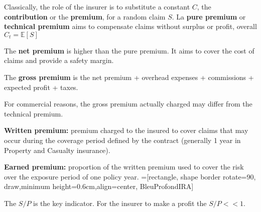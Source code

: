\begin{f}
Classically, the role of the insurer is to substitute a constant $C$, the \textbf{contribution} or the \textbf{premium}, for a random claim $S$.
La \textbf{pure premium} or \textbf{technical premium} aims 
to compensate claims without surplus or profit, overall $C_t = \mathbb{E}[S]$
	
	The \textbf{net premium} is higher than the pure premium. It aims to cover the cost of claims and provide a safety margin.
	
	The \textbf{gross premium} is the net premium + overhead expenses + commissions + expected profit + taxes.
	
	For commercial reasons, the gross premium actually charged may differ from the technical premium.

	\textbf{Written premium:} premium charged to the insured to cover claims that may occur during the 
coverage period defined by the contract (generally 1 year in Property and Casualty insurance).

\textbf{Earned premium:} proportion of the written premium used to cover the risk over the exposure period of 
one policy year.
=[rectangle, shape border rotate=90, draw,minimum height=0.6cm,align=center, BleuProfondIRA]

\resizebox{\linewidth}{!}
{
}
The $S/P$ is the key indicator. For the insurer to make a profit the $S/P<<1$.
\end{f}

